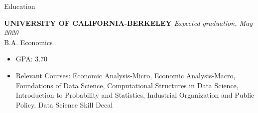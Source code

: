 \documentclass{resume}
\begin{document}

\begin{rSection}{Education}

{\bf UNIVERSITY OF CALIFORNIA-BERKELEY 
} \hfill {\em Expected graduation, May 2020} 
\\ B.A. Economics
\begin{itemize}
    \item GPA: 3.70
    \item Relevant Courses: Economic Analysis-Micro, Economic Analysis-Macro, Foundations of Data Science, Computational Structures in Data Science, Introduction to Probability and Statistics, Industrial Organization and Public Policy, Data Science Skill Decal 
\end{itemize}
\end{rSection}

\end{document}
